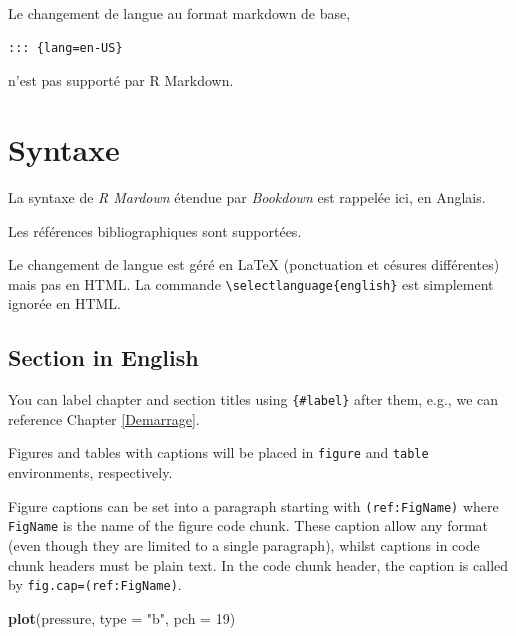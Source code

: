 \documentclass[
  11pt,
  american,
  a4paper,
  extrafontsizes,onecolumn,openright
  ]{memoir}
\newenvironment{Shaded}{\begin{snugshade}}{\end{snugshade}}
\newcommand{\DataTypeTok}[1]{\textcolor[rgb]{0.13,0.29,0.53}{#1}}
\newcommand{\DecValTok}[1]{\textcolor[rgb]{0.00,0.00,0.81}{#1}}
\newcommand{\KeywordTok}[1]{\textcolor[rgb]{0.13,0.29,0.53}{\textbf{#1}}}
\newcommand{\NormalTok}[1]{#1}
\newcommand{\StringTok}[1]{\textcolor[rgb]{0.31,0.60,0.02}{#1}}
\begin{document}
Le changement de langue au format markdown de base,

\begin{verbatim}
::: {lang=en-US}
\end{verbatim}

n'est pas supporté par R Markdown.

\hypertarget{syntaxe}{%
\chapter{Syntaxe}\label{syntaxe}}

La syntaxe de \emph{R Mardown} étendue par \emph{Bookdown} est rappelée ici, en Anglais.

Les références bibliographiques \autocite{xie2015} sont supportées.

Le changement de langue est géré en LaTeX (ponctuation et césures différentes) mais pas en HTML.
La commande \texttt{\textbackslash{}selectlanguage\{english\}} est simplement ignorée en HTML.


\hypertarget{section-in-english}{%
\section{Section in English}\label{section-in-english}}

You can label chapter and section titles using \texttt{\{\#label\}} after them, e.g., we can reference Chapter \ref{Demarrage}.

Figures and tables with captions will be placed in \texttt{figure} and \texttt{table} environments, respectively.

Figure captions can be set into a paragraph starting with \texttt{(ref:FigName)} where \texttt{FigName} is the name of the figure code chunk.
These caption allow any format (even though they are limited to a single paragraph), whilst captions in code chunk headers must be plain text.
In the code chunk header, the caption is called by \texttt{fig.cap=\textquotesingle{}(ref:FigName)\textquotesingle{}}.



\scriptsize

\begin{Shaded}
\begin{Highlighting}[]
\KeywordTok{plot}\NormalTok{(pressure, }\DataTypeTok{type =} \StringTok{"b"}\NormalTok{, }\DataTypeTok{pch =} \DecValTok{19}\NormalTok{)}
\end{Highlighting}
\end{Shaded}
\end{document}
